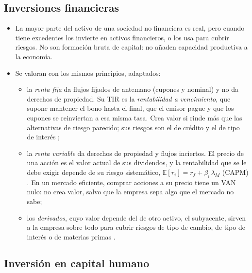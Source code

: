 \documentclass[11pt]{article}
\begin{document}
\subsection{Inversiones financieras}\label{sec:financieras}

\begin{itemize}
\item La mayor parte del activo de una sociedad no financiera es real, pero cuando tiene excedentes los invierte en activos financieros, o los usa para cubrir riesgos. No son formación bruta de capital: no añaden capacidad productiva a la economía.
\item Se valoran con los mismos principios, adaptados:
  \begin{itemize}
  \item la \emph{renta fija} da flujos fijados de antemano (cupones y nominal) y no da derechos de propiedad. Su TIR es la \emph{rentabilidad a vencimiento}, que supone mantener el bono hasta el final, que el emisor pague y que los cupones se reinviertan a esa misma tasa. Crea valor si rinde más que las alternativas de riesgo parecido; sus riesgos son el de crédito y el de tipo de interés ;
  \item la \emph{renta variable} da derechos de propiedad y flujos inciertos. El precio de una acción es el valor actual de sus dividendos, y la rentabilidad que se le debe exigir depende de su riesgo sistemático, $\mathbb{E}[r_i]=r_f+\beta_i\,\lambda_M$ (CAPM) . En un mercado eficiente, comprar acciones a su precio tiene un VAN nulo: no crea valor, salvo que la empresa sepa algo que el mercado no sabe;
  \item los \emph{derivados}, cuyo valor depende del de otro activo, el subyacente, sirven a la empresa sobre todo para cubrir riesgos de tipo de cambio, de tipo de interés o de materias primas .
  \end{itemize}
\end{itemize}

\subsection{Inversión en capital humano}\label{sec:capital-humano}
\end{document}
